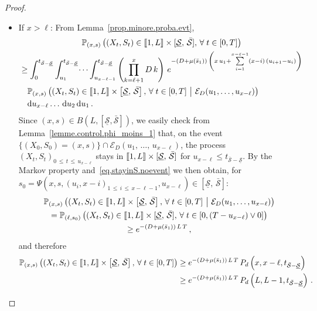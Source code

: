 \documentclass[10pt]{amsart}
\theoremstyle{definition}\newtheorem{defi}[theo]{Definition}\newtheorem{rema}[theo]{Remark}\newtheorem{exam}[theo]{Example}\newtheorem{exem}[theo]{Example}\newtheorem{nota}[theo]{Notation}
\newcommand{\llbracket}{\mathopen{[\mkern -2.7mu[}}
\newcommand{\rrbracket}{\mathclose{]\mkern -2.7mu]}}
\newcommand{\PP}{\mathbb{P}}
\newcommand{\clE}{\mathcal{E}}
\newcommand{\dif}{\mathrm{d}}
\newcommand{\Smin}{\underline{\mathcal{S}}}
\newcommand{\Smax}{\bar{\mathcal{S}}}
\newcommand{\barmu}{\mu(\bar s_1)}
\newcommand{\setunL}{\llbracket 1, L\rrbracket}
\newcommand{\1}{\mathbf{1}}
\let\oldforall\forall
\renewcommand*{\forall}{\mathrel{\oldforall}}
\begin{document}
\begin{proof}
\begin{itemize}
\item If $x > \ell$: From Lemma~\ref{prop.minore.proba.evt},
\begin{multline*}
\PP_{(x,s)}
\left(\left(X_t,S_t\right) \in\setunL \times [\Smin, \, \Smax], \,
\forall t\in[0,T]\right)
\\
\begin{aligned}
&\geq \int_0^{t_{\Smax-\Smin}} \int_{u_1}^{t_{\Smax-\Smin}}\dots \int_{u_{x-\ell-1}}^{t_{\Smax-\Smin}}
\left(\prod_{k=\ell+1}^{x}D\,k\right)\, e^{-(D+\barmu)\,\left(x\,u_1+
\sum\limits_{i=1}^{x-\ell-1}(x-i)\,(u_{i+1}-u_{i})\right)}\,
\\
& \quad
\PP_{(x,s)}
\left((X_t,S_t) \in \setunL\times \left[\Smin, \, \Smax\right], \,
\forall t\in[0,T] \ \middle| \ \clE_D(u_1,\dots,u_{x-\ell}) \right)\,
\\
& \quad
\dif u_{x-\ell}\dots\,\dif u_2\,\dif u_1\,.
\end{aligned}
\end{multline*}
Since $(x,s)\in B(L,[\Smin,\Smax])$, we easily check from Lemma~\ref{lemme.control.phi_moins_1} that, on the event $\{(X_0,S_0)=(x,s)\}\cap\clE_D(u_1,\,\dots,\,u_{x-\ell})$, the process $(X_t,S_t)_{0\,\leq\,t\,\leq\,u_{x-\ell}}$ stays in $\setunL \times [\Smin, \, \Smax]$ for $u_{x-\ell}\leq t_{\Smax-\Smin}$. By the Markov property and~\eqref{eq.stayinS.noevent} we then obtain, for $s_0=\Psi(x,s,(u_i,x-i)_{1\,\leq \,i\,\leq\,x-\ell-1},u_{x-\ell})\in [\Smin, \, \Smax]$:
\begin{multline*}
\PP_{(x,s)}
\left((X_t,S_t) \in \setunL\times \left[\Smin, \, \Smax\right], \,
\forall t\in[0,T] \ \middle| \ \clE_D(u_1,\dots,u_{x-\ell}) \right)
\\
= \PP_{(\ell,s_0)}
\left(\left(X_t,S_t\right) \in \setunL \times [\Smin, \, \Smax], \,
\forall t\in\left[0,(T-u_{x-\ell})\vee 0\right] \right)
\\
\geq e^{-(D+\barmu)\,L\,T}\,,
\end{multline*}
and therefore
\begin{align*}
\PP_{(x,s)}
\left(\left(X_t,S_t\right) \in \setunL \times \left[\Smin, \, \Smax\right], \,
\forall t\in[0,T]\right) & \geq e^{-(D+\barmu)\,L\,T}\, P_d\left(x,x-\ell, t_{\Smax-\Smin}\right)
\\ & \geq e^{-(D+\barmu)\,L\,T}\, P_d\left(L,L-1, t_{\Smax-\Smin}\right)\,.
\end{align*}


\end{itemize}
\end{proof}
\end{document}
